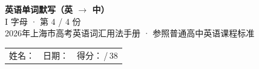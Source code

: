 \documentclass[10pt,a4paper]{article}
\begin{document}
\pagestyle{plain}

\begin{center}
{\LARGE\bfseries 英语单词默写（英 $\to$ 中）}\\[0.22em]
{\large I 字母 · 第 4 / 4 份}\\[0.18em]
{\small 2026年上海市高考英语词汇用法手册 · 参照普通高中英语课程标准}
\end{center}

\vspace{0.25em}
\noindent\begin{tabular}{@{}p{}@{}p{}@{}p{}@{}}
姓名：\underline{\hspace{2.0cm}} & 日期：\underline{\hspace{2.0cm}} & 得分：\underline{\hspace{1.3cm}}\,/\,38 \\
\end{tabular}

\vspace{0.3em}

\vspace{0.08em}
\end{document}
